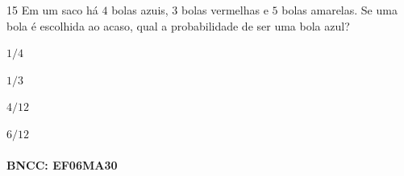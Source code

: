 \num{15} Em um saco há $4$ bolas azuis, $3$ bolas vermelhas e $5$ bolas amarelas.
Se uma bola é escolhida ao acaso, qual a probabilidade de ser uma bola
azul?

\begin{escolha}
\item
  $1/4$
\item
  $1/3$
\item
  $4/12$
\item
  $6/12$
\end{escolha}

\paragraph{BNCC: EF06MA30 }


